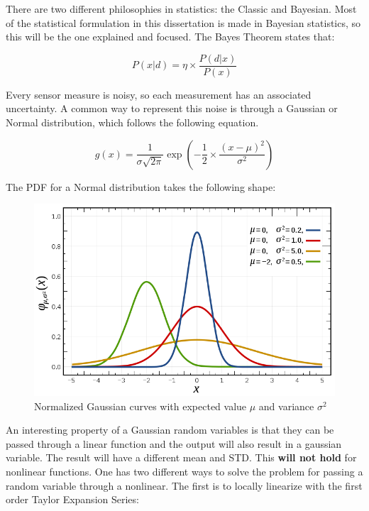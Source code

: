 There are two different philosophies in statistics: the Classic and Bayesian. Most of the statistical formulation in this dissertation is made in Bayesian statistics, so this will be the one explained and focused. The Bayes Theorem states that:

\begin{equation}
    P(x|d) = \eta \times \frac{P(d|x)}{P(x)}
\end{equation}


Every sensor measure is noisy, so each measurement has an associated uncertainty. A common way to represent this noise is through a Gaussian or Normal distribution, which follows the following equation.

\begin{equation}
    g(x) = \frac{1}{\sigma\sqrt{2\pi}}\exp(-\frac{1}{2}\times\frac{(x - \mu)^2}{\sigma^2})
\end{equation}

The \acl*{PDF} for a Normal distribution takes the following shape:

\begin{figure}[H]
    \centering
    \includegraphics[width=0.5\linewidth]{images/statistics/Normal_Distribution_PDF.png}
    \caption{Normalized Gaussian curves with expected value $\mu$ and variance $\sigma^2$ \cite{enwiki:1100476982}}
    \label{fig: normal pdf}
\end{figure}


An interesting property of a Gaussian random variables is that they can be passed through a linear function and the output will also result in a gaussian variable. The result will have a different mean and \acs*{STD}. This \textbf{will not hold} for nonlinear functions. One has two different ways to solve the problem for passing a random variable through a nonlinear. The first is to locally linearize with the first order Taylor Expansion Series:

